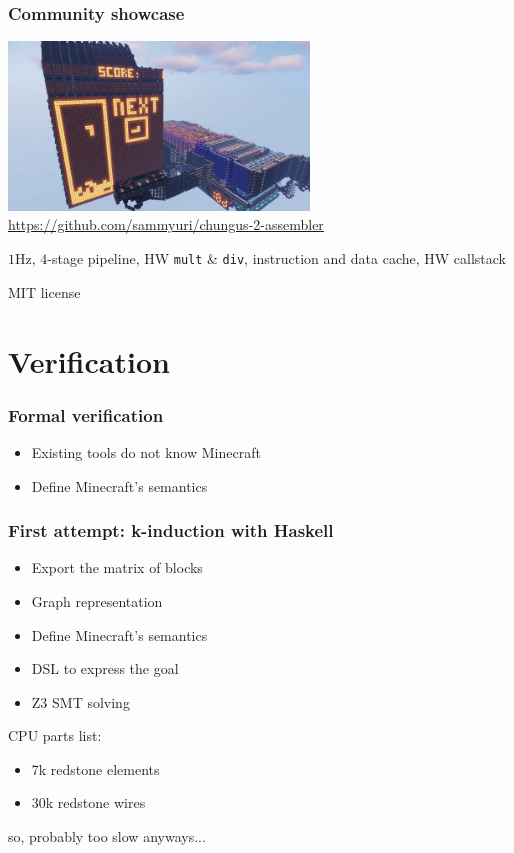 \documentclass[aspectratio=169]{beamer}
\newcommand{\hw}{HW}
\begin{document}
\begin{frame}
	\frametitle{Community showcase}
	\center
	\includegraphics[width=0.6\textwidth]{imgs/chungus.png}
	\url{https://github.com/sammyuri/chungus-2-assembler}

	$1$Hz, $4$-stage pipeline, \hw{} \texttt{mult} \& \texttt{div}, instruction
	and data cache, \hw{} callstack

	MIT license
\end{frame}

\section{Verification}

\begin{frame}
	\frametitle{Formal verification}
	\begin{itemize}
		\item Existing tools do not know Minecraft
		\item Define Minecraft's semantics
	\end{itemize}
\end{frame}

\begin{frame}
	\frametitle{First attempt: k-induction with Haskell}
	\begin{itemize}
		\item Export the matrix of blocks
		\item Graph representation %
		\item Define Minecraft's semantics
		\item DSL to express the goal
		\item Z3 SMT solving
	\end{itemize}


	CPU parts list:
	\begin{itemize}
		\item 7k redstone elements
		\item 30k redstone wires
	\end{itemize}

	so, probably too slow anyways...
\end{frame}
\end{document}
